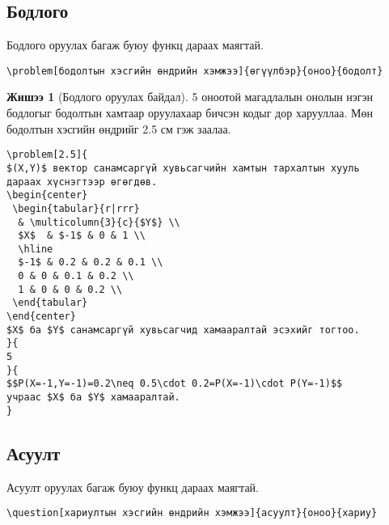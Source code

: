\documentclass[10pt]{article}
\theoremstyle{definition}
\newtheorem{example}{Жишээ}
\begin{document}
\subsection{Бодлого}

Бодлого оруулах багаж буюу функц дараах маягтай.
\begin{verbatim}
\problem[бодолтын хэсгийн өндрийн хэмжээ]{өгүүлбэр}{оноо}{бодолт}
\end{verbatim}

\begin{example}[Бодлого оруулах байдал]
5 оноотой магадлалын онолын нэгэн бодлогыг бодолтын хамтаар оруулахаар бичсэн кодыг дор харууллаа. Мөн бодолтын хэсгийн өндрийг 2.5 см гэж заалаа.
\begin{verbatim}
\problem[2.5]{
$(X,Y)$ вектор санамсаргүй хувьсагчийн хамтын тархалтын хууль 
дараах хүснэгтээр өгөгдөв.
\begin{center}
 \begin{tabular}{r|rrr}
  & \multicolumn{3}{c}{$Y$} \\
  $X$  & $-1$ & 0 & 1 \\
  \hline
  $-1$ & 0.2 & 0.2 & 0.1 \\
  0 & 0 & 0.1 & 0.2 \\
  1 & 0 & 0 & 0.2 \\
 \end{tabular}
\end{center}
$X$ ба $Y$ санамсаргүй хувьсагчид хамааралтай эсэхийг тогтоо.
}{
5
}{
$$P(X=-1,Y=-1)=0.2\neq 0.5\cdot 0.2=P(X=-1)\cdot P(Y=-1)$$
учраас $X$ ба $Y$ хамааралтай.
}
\end{verbatim}
\end{example}

\subsection{Асуулт}

Асуулт оруулах багаж буюу функц дараах маягтай.
\begin{verbatim}
\question[хариултын хэсгийн өндрийн хэмжээ]{асуулт}{оноо}{хариу}
\end{verbatim}
\end{document}
